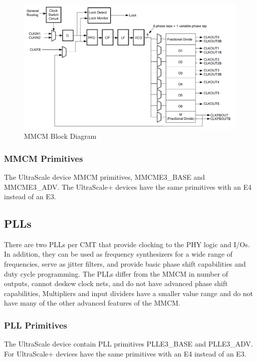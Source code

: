 \documentclass[12pt, a4paper]{report}
\begin{document}
    \begin{figure}[H]
        \begin{center}
            \includegraphics[width=\textwidth]{images/MMCM.png}
            \caption{MMCM Block Diagram}
            \label{MMCM}
        \end{center}
    \end{figure}

    \subsubsection{MMCM Primitives}
    The UltraScale device MMCM primitives, MMCME3\_BASE and MMCME3\_ADV. The UltraScale+ devices have the same primitives with an E4 instead of an E3. 

    \subsection{PLLs}
    There are two PLLs per CMT that provide clocking to the PHY logic and I/Os. In addition, they can be used as frequency synthesizers for a wide range of frequencies, serve as jitter  filters, and provide basic phase shift capabilities and duty cycle programming. The PLLs differ from the MMCM in number of outputs, cannot deskew clock nets, and do not have
    advanced phase shift capabilities, Multipliers and input dividers have a smaller value range and do not have many of the other advanced features of the MMCM.
    
    \subsubsection{PLL Primitives}
    The UltraScale device contain PLL primitives PLLE3\_BASE and PLLE3\_ADV.
    For UltraScale+ devices have the same primitives with an E4 instead of an E3. 
\end{document}
